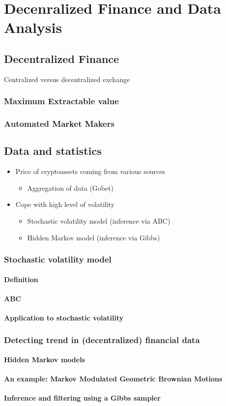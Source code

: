 \chapter{Decenralized Finance and Data Analysis}\label{chap:defi}
\section{Decentralized Finance}
Centralized versus decentralized exchange
\subsection{Maximum Extractable value}
\subsection{Automated Market Makers}
\section{Data and statistics}
\begin{itemize}
\item Price of cryptoassets coming from various sources
\begin{itemize}
\item Aggregation of data (Gobet)
\end{itemize}
\item Cope with high level of volatility
\begin{itemize}
  \item Stochastic volatility model (inference via ABC)
  \item Hidden Markov model (inference via Gibbs)
\end{itemize}
\end{itemize}
\subsection{Stochastic volatility model}
\subsubsection{Definition}
\subsubsection{ABC}
\subsubsection{Application to stochastic volatility}
\subsection{Detecting trend in (decentralized) financial data}
\subsubsection{Hidden Markov models}
\subsubsection{An example: Markov Modulated Geometric Brownian Motions}
\subsubsection{Inference and filtering using a Gibbs sampler}